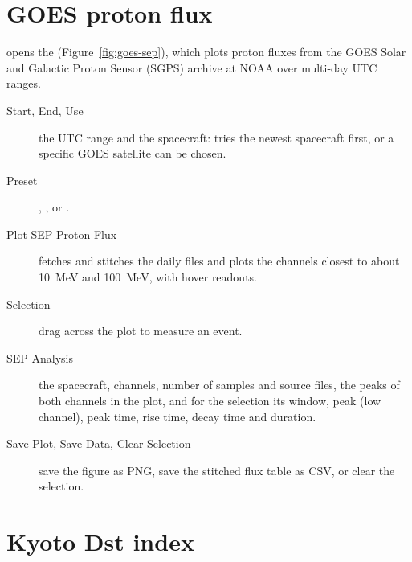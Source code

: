 
\section{GOES proton flux}
\label{sec:goes-sep}

 opens the
 (Figure~\ref{fig:goes-sep}), which plots proton fluxes
from the GOES Solar and Galactic Proton Sensor (SGPS) archive at NOAA over multi-day UTC
ranges.


\begin{description}
  \item[Start, End, Use] the UTC range and the spacecraft: 
    tries the newest spacecraft first, or a specific GOES satellite can be chosen.
  \item[Preset] , ,  or
    .
  \item[Plot SEP Proton Flux] fetches and stitches the daily files and plots the channels
    closest to about 10~MeV and 100~MeV, with hover readouts.
  \item[Selection] drag across the plot to measure an event.
  \item[SEP Analysis] the spacecraft, channels, number of samples and source files, the
    peaks of both channels in the plot, and for the selection its window, peak (low
    channel), peak time, rise time, decay time and duration.
  \item[Save Plot, Save Data, Clear Selection] save the figure as PNG, save the stitched
    flux table as CSV, or clear the selection.
\end{description}

\section{Kyoto Dst index}
\label{sec:dst}

